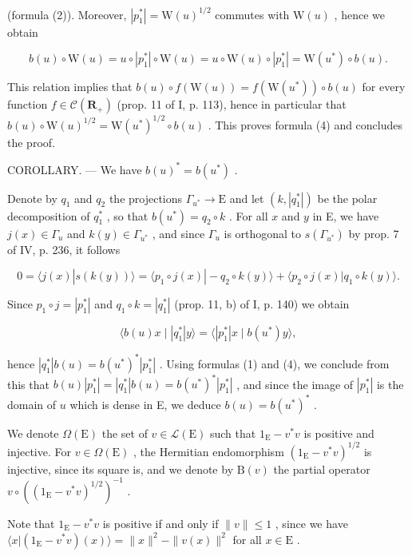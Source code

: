 (formula (2)). Moreover, \(|p_{1}^{*}| = \mathrm{W}(u)^{1/2}\) commutes with \(\mathrm{W}(u)\) , hence we obtain

\[
b (u) \circ \mathrm{W} (u) = u \circ | p _ {1} ^ {*} | \circ \mathrm{W} (u) = u \circ \mathrm{W} (u) \circ | p _ {1} ^ {*} | = \mathrm{W} (u ^ {*}) \circ b (u).
\]

This relation implies that \(b(u) \circ f(\mathrm{W}(u)) = f(\mathrm{W}(u^{*})) \circ b(u)\) for every function \(f \in \mathcal{C}(\mathbf{R}_{+})\) (prop. 11 of I, p. 113), hence in particular that \(b(u) \circ \mathrm{W}(u)^{1/2} = \mathrm{W}(u^{*})^{1/2} \circ b(u)\) . This proves formula (4) and concludes the proof.

COROLLARY. --- We have \(b(u)^{*} = b(u^{*})\) .

Denote by \(q_{1}\) and \(q_{2}\) the projections \(\Gamma_{u^{*}}\to\mathrm{E}\) and let \((k,|q_{1}^{*}|)\) be the polar decomposition of \(q_{1}^{*}\) , so that \(b(u^{*})=q_{2}\circ k\) . For all \(x\) and \(y\) in E, we have \(j(x)\in\Gamma_{u}\) and \(k(y)\in\Gamma_{u^{*}}\) , and since \(\Gamma_{u}\) is orthogonal to \(s(\Gamma_{u^{*}})\) by prop. 7 of IV, p. 236, it follows

\[
0 = \langle j (x) | s (k (y)) \rangle = \langle p _ {1} \circ j (x) | - q _ {2} \circ k (y) \rangle + \langle p _ {2} \circ j (x) | q _ {1} \circ k (y) \rangle .
\]

Since \(p_1 \circ j = |p_1^*|\) and \(q_1 \circ k = |q_1^*|\) (prop. 11, b) of I, p. 140) we obtain

\[
\langle b (u) x \mid | q _ {1} ^ {*} | y \rangle = \langle | p _ {1} ^ {*} | x \mid b (u ^ {*}) y \rangle ,
\]

hence \(|q_1^*|b(u) = b(u^*)^* |p_1^*|\) . Using formulas (1) and (4), we conclude from this that \(b(u)|p_1^*| = |q_1^*|b(u) = b(u^*)^* |p_1^*|\) , and since the image of \(|p_1^*|\) is the domain of \(u\) which is dense in E, we deduce \(b(u) = b(u^*)^*\) .

We denote \(\Omega(\mathrm{E})\) the set of \(v \in \mathcal{L}(\mathrm{E})\) such that \(1_{\mathrm{E}} - v^{*}v\) is positive and injective. For \(v \in \Omega(\mathrm{E})\) , the Hermitian endomorphism \((1_{\mathrm{E}} - v^{*}v)^{1/2}\) is injective, since its square is, and we denote by \(\mathrm{B}(v)\) the partial operator \(v \circ ((1_{\mathrm{E}} - v^{*}v)^{1/2})^{-1}\) .

Note that \(1_{\mathrm{E}} - v^{*}v\) is positive if and only if \(\| v\| \leqslant 1\) , since we have \(\langle x|(1_{\mathrm{E}} - v^{*}v)(x)\rangle = \| x\| ^2 -\| v(x)\| ^2\) for all \(x\in \mathrm{E}\) .

